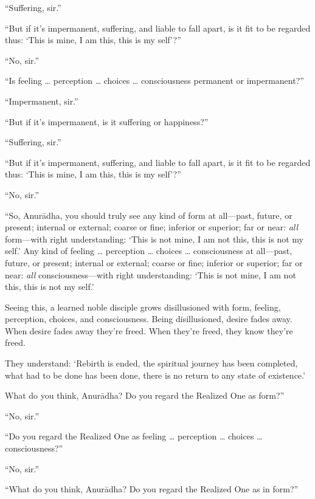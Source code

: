 \documentclass[12pt,openany]{book}%
\begin{document}
“Suffering, sir.” 

“But if it’s impermanent, suffering, and liable to fall apart, is it fit to be regarded thus: ‘This is mine, I am this, this is my self’?” 

“No, sir.” 

“Is feeling … perception … choices … consciousness permanent or impermanent?” 

“Impermanent, sir.” 

“But if it’s impermanent, is it suffering or happiness?” 

“Suffering, sir.” 

“But if it’s impermanent, suffering, and liable to fall apart, is it fit to be regarded thus: ‘This is mine, I am this, this is my self’?” 

“No, sir.” 

“So, \textsanskrit{Anurādha}, you should truly see any kind of form at all—past, future, or present; internal or external; coarse or fine; inferior or superior; far or near: \emph{all} form—with right understanding: ‘This is not mine, I am not this, this is not my self.’ Any kind of feeling … perception … choices … consciousness at all—past, future, or present; internal or external; coarse or fine; inferior or superior; far or near: \emph{all} consciousness—with right understanding: ‘This is not mine, I am not this, this is not my self.’ 

Seeing this, a learned noble disciple grows disillusioned with form, feeling, perception, choices, and consciousness. Being disillusioned, desire fades away. When desire fades away they’re freed. When they’re freed, they know they’re freed. 

They understand: ‘Rebirth is ended, the spiritual journey has been completed, what had to be done has been done, there is no return to any state of existence.’ 

What do you think, \textsanskrit{Anurādha}? Do you regard the Realized One as form?” 

“No, sir.” 

“Do you regard the Realized One as feeling … perception … choices … consciousness?” 

“No, sir.” 

“What do you think, \textsanskrit{Anurādha}? Do you regard the Realized One as in form?” 
\end{document}
